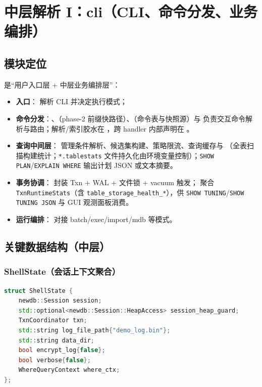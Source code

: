 \section{中层解析 I：cli（CLI、命令分发、业务编排）}

\subsection{模块定位}

 是“用户入口层 + 中层业务编排层”：

\begin{itemize}
  \item \textbf{入口}： 解析 CLI 并决定执行模式；
  \item \textbf{命令分发}：、（phase-2 前缀快路径）、（命令表与快照源）与  负责交互命令解析与路由；解析/索引胶水在 ，跨 handler 内部声明在 。
  \item \textbf{查询中间层}： 管理条件解析、候选集构建、策略限流、查询缓存与 （全表扫描构建统计；\texttt{*.tablestats} 文件持久化由环境变量控制）；\texttt{SHOW PLAN}/\texttt{EXPLAIN WHERE} 输出计划 JSON 或文本摘要。
  \item \textbf{事务协调}： 封装 Txn + WAL + 文件锁 + vacuum 触发； 聚合 \texttt{TxnRuntimeStats}（含 \texttt{table\_storage\_health\_*}），供 \texttt{SHOW TUNING}/\texttt{SHOW TUNING JSON} 与 GUI 观测面板消费。
  \item \textbf{运行编排}： 对接 batch/exec/import/mdb 等模式。
\end{itemize}

\subsection{关键数据结构（中层）}

\subsubsection{ShellState（会话上下文聚合）}

\begin{lstlisting}[language=C++,caption={ShellState（节选）}]
struct ShellState {
    newdb::Session session;
    std::optional<newdb::Session::HeapAccess> session_heap_guard;
    TxnCoordinator txn;
    std::string log_file_path{"demo_log.bin"};
    std::string data_dir;
    bool encrypt_log{false};
    bool verbose{false};
    WhereQueryContext where_ctx;
};
\end{lstlisting}

